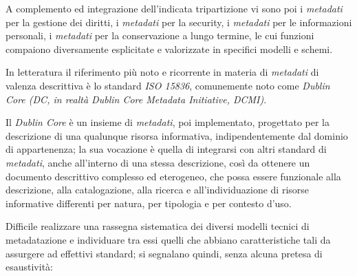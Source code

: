 \documentclass[
  b5paper,
  twoside,
  12pt,
  chapterprefix=false,
  bibliography=totocnumbered,
  parskip=false]{scrbook}
\begin{document}
A complemento ed integrazione dell'indicata tripartizione vi sono poi i
\emph{metadati} per la gestione dei diritti, i \emph{metadati} per la security, i
\emph{metadati} per le informazioni personali, i \emph{metadati} per la
conservazione a lungo termine, le cui funzioni compaiono diversamente
esplicitate e valorizzate in specifici modelli e schemi.

In letteratura il riferimento più noto e ricorrente in materia di
\emph{metadati} di valenza descrittiva è lo standard \emph{ISO 15836}, comunemente
noto come \emph{Dublin Core (DC, in realtà Dublin Core Metadata Initiative,
DCMI)}.

Il \emph{Dublin Core} è un insieme di \emph{metadati}, poi implementato,
progettato per la descrizione di una qualunque risorsa informativa,
indipendentemente dal dominio di appartenenza; la sua vocazione è quella
di integrarsi con altri standard di \emph{metadati}, anche all'interno di una
stessa descrizione, così da ottenere un documento descrittivo complesso
ed eterogeneo, che possa essere funzionale alla descrizione, alla
catalogazione, alla ricerca e all'individuazione di risorse informative
differenti per natura, per tipologia e per contesto d'uso.

Difficile realizzare una rassegna sistematica dei diversi modelli
tecnici di metadatazione e individuare tra essi quelli che abbiano
caratteristiche tali da assurgere ad effettivi standard; si segnalano
quindi, senza alcuna pretesa di esaustività:
\end{document}
